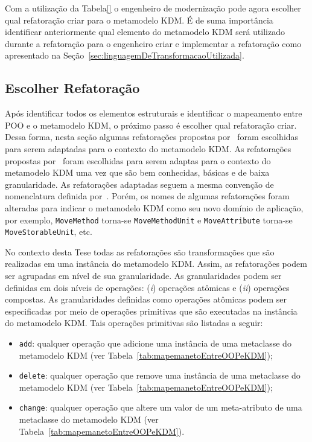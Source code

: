 Com a utilização da Tabela\ref{} o engenheiro de modernização pode agora escolher qual refatoração criar para o metamodelo KDM. É de suma importância identificar anteriormente qual elemento do metamodelo KDM será utilizado durante a refatoração para o engenheiro criar e implementar a refatoração como apresentado na Seção~\ref{sec:linguagemDeTransformacaoUtilizada}.

\subsection{Escolher Refatoração}\label{sec:refatoracao_para_o_metamodelo_kdm}

Após identificar todos os elementos estruturais e identificar o mapeamento entre POO e o metamodelo KDM, o próximo passo é escolher qual refatoração criar. Dessa forma, nesta seção algumas refatorações propostas por~ foram escolhidas para serem adaptadas para o contexto do metamodelo KDM. As refatorações propostas por~ foram escolhidas para serem adaptas para o contexto do metamodelo KDM uma vez que são bem conhecidas, básicas e de baixa granularidade. As refatorações adaptadas seguem a mesma convenção de nomenclatura definida por~. Porém, os nomes de algumas refatorações foram alteradas para indicar o metamodelo KDM como seu novo domínio de aplicação, por exemplo, \texttt{MoveMethod} torna-se \texttt{MoveMethodUnit} e \texttt{MoveAttribute} torna-se \texttt{MoveStorableUnit}, etc. 

No contexto desta Tese todas as refatorações são transformações que são realizadas em uma instância do metamodelo KDM. Assim, as refatorações podem ser agrupadas em nível de sua granularidade. As granularidades podem ser definidas em dois níveis de operações: (\textit{i}) operações atômicas e (\textit{ii}) operações compostas. As granularidades definidas como operações atômicas podem ser especificadas por meio de operações primitivas que são executadas na instância do metamodelo KDM. Tais operações primitivas são listadas a seguir:

\begin{itemize}
\item \texttt{add}: qualquer operação que adicione uma instância de uma metaclasse do metamodelo KDM (ver Tabela~\ref{tab:mapemanetoEntreOOPeKDM});
\item \texttt{delete}: qualquer operação que remove uma instância de uma metaclasse do metamodelo KDM (ver Tabela~\ref{tab:mapemanetoEntreOOPeKDM});
\item \texttt{change}: qualquer operação que altere um valor de um meta-atributo de uma metaclasse do metamodelo KDM (ver Tabela~\ref{tab:mapemanetoEntreOOPeKDM}).
\end{itemize}

